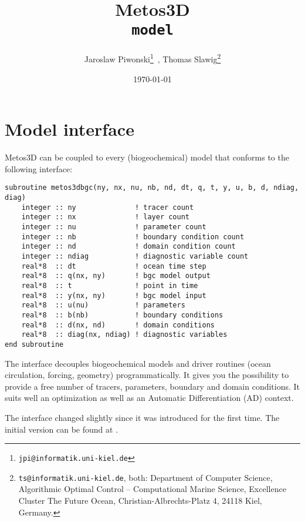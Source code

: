 \documentclass{article}
\begin{document}
%
%
\title{
Metos3D \\
\medskip
\texttt{model}
}
\author{
Jaroslaw Piwonski\thanks{\texttt{jpi@informatik.uni-kiel.de}} \,,
Thomas Slawig\thanks{\texttt{ts@informatik.uni-kiel.de},
both: Department of Computer Science, Algorithmic Optimal Control -- Computational Marine Science,
Excellence Cluster The Future Ocean, Christian-Albrechts-Platz 4, 24118 Kiel, Germany.}
}
\date{\today}
\maketitle

%
%
\section{Model interface}

Metos3D \citep[][]{PiwSla16} can be coupled to every (biogeochemical) model that
conforms to the following interface:

\begin{verbatim}
subroutine metos3dbgc(ny, nx, nu, nb, nd, dt, q, t, y, u, b, d, ndiag, diag)
    integer :: ny              ! tracer count
    integer :: nx              ! layer count
    integer :: nu              ! parameter count
    integer :: nb              ! boundary condition count
    integer :: nd              ! domain condition count
    integer :: ndiag           ! diagnostic variable count
    real*8  :: dt              ! ocean time step
    real*8  :: q(nx, ny)       ! bgc model output
    real*8  :: t               ! point in time
    real*8  :: y(nx, ny)       ! bgc model input
    real*8  :: u(nu)           ! parameters
    real*8  :: b(nb)           ! boundary conditions
    real*8  :: d(nx, nd)       ! domain conditions
    real*8  :: diag(nx, ndiag) ! diagnostic variables
end subroutine
\end{verbatim}

The interface decouples biogeochemical models and driver routines
(ocean circulation, forcing, geometry) programmatically.
%
It gives you the possibility to provide a free number of tracers,
parameters, boundary and domain conditions. It suits well an
optimization as well as an Automatic Differentiation (AD) context.

The interface changed slightly since it was introduced for the first time.
The initial version can be found at \citep[][]{PiwSla16}.

%
%
%


%
\end{document}
